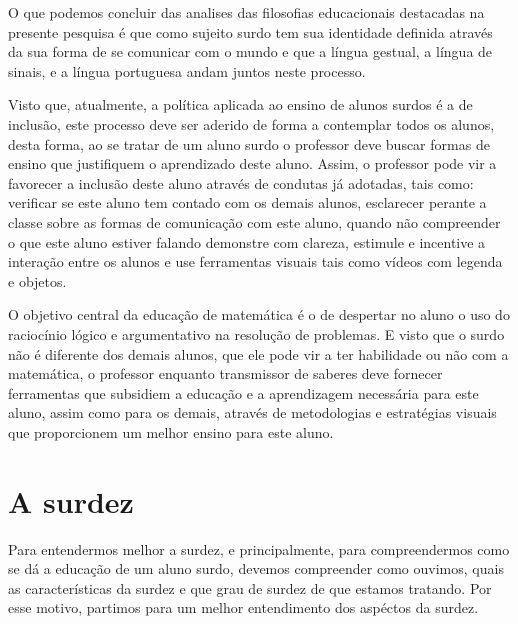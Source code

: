 \documentclass[brasil]{abnt}
\begin{document}
	O que podemos concluir das analises das filosofias educacionais destacadas na presente pesquisa é que como sujeito surdo tem sua identidade definida através da sua forma de se comunicar com o mundo e que 
	a língua gestual, a língua de sinais, e a língua portuguesa andam juntos neste processo.     
	
	Visto que, atualmente, a política aplicada ao ensino de alunos surdos é a de inclusão, este processo deve ser aderido de forma a contemplar todos os alunos, desta forma, ao se tratar de um aluno surdo o professor deve buscar formas de ensino que justifiquem o aprendizado deste aluno.
	Assim, o professor pode vir a favorecer a inclusão deste aluno através de condutas já adotadas, tais como: verificar se este aluno tem contado com os demais alunos, esclarecer perante a 
	classe sobre as formas de comunicação com este aluno, quando não compreender o que este aluno estiver falando demonstre com clareza, estimule e incentive a interação entre os alunos e use ferramentas 
	visuais tais como vídeos com legenda e objetos.        
	
	O objetivo central da educação de matemática é o de despertar no aluno o uso do raciocínio lógico e argumentativo na resolução de problemas. E visto que o surdo não é diferente dos demais alunos, que ele pode vir a 
	ter habilidade ou não com a matemática, o professor enquanto transmissor de saberes deve fornecer ferramentas que subsidiem a educação e a aprendizagem necessária para este aluno, assim como para os demais, através
	de metodologias e estratégias visuais que proporcionem um melhor ensino para este aluno. 
  
  

	\nocite{aud}
	\nocite{coch}
	\nocite{crist}
	\nocite{audi}
	\nocite{vs}
	\nocite{phs}
	\nocite{qes}
	\nocite{s}
	\nocite{fil}
	\nocite{bev}
	\nocite{bot}
	\nocite{l1}
	\nocite{l2}
	\nocite{l3}
	\nocite{l4}
	\nocite{l5}
	\nocite{l6}
	\nocite{capo}
	\nocite{car}
	\nocite{cr}
	\nocite{Ubi}
	\nocite{dec}
	\nocite{fa}
	\nocite{gold}
	\nocite{lacerd}
	\nocite{lei}
	\nocite{lip}
	\nocite{machado}
	\nocite{PC}
	\nocite{macha}
	\nocite{mm}
	\nocite{mon}
	\nocite{nogu}
	\nocite{nunes}
	\nocite{oliveira}
	\nocite{Paul}
	\nocite{jur}
	\nocite{pei}
	\nocite{crist}
	\nocite{quas}
	\nocite{qua}
	\nocite{qep}
	\nocite{quads}
	\nocite{rodr}
	\nocite{sado}
	\nocite{Sales}
	\nocite{sal}
	\nocite{san}
	\nocite{sp}
	\nocite{ei}
	\nocite{silva}
	\nocite{soares}
	\nocite{sou}
    
\anexo

\chapter{A surdez}
	Para entendermos melhor a surdez, e principalmente, para compreendermos como se dá a educação de um aluno surdo, devemos compreender como ouvimos, quais as características da surdez e 
	que grau de surdez de que estamos tratando. Por esse motivo, partimos para um melhor entendimento dos aspéctos da surdez.	
			
\end{document}
